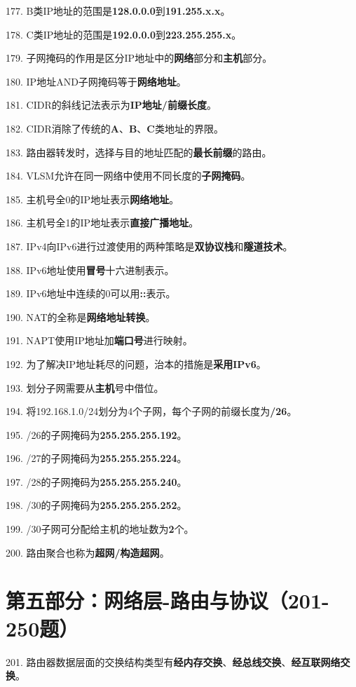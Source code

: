\documentclass[12pt,a4paper,openany]{ctexbook}
\begin{document}
177. B类IP地址的范围是\textbf{128.0.0.0}到\textbf{191.255.x.x}。

178. C类IP地址的范围是\textbf{192.0.0.0}到\textbf{223.255.255.x}。

179. 子网掩码的作用是区分IP地址中的\textbf{网络}部分和\textbf{主机}部分。

180. IP地址AND子网掩码等于\textbf{网络地址}。

181. CIDR的斜线记法表示为\textbf{IP地址/前缀长度}。

182. CIDR消除了传统的\textbf{A}、\textbf{B}、\textbf{C}类地址的界限。

183. 路由器转发时，选择与目的地址匹配的\textbf{最长前缀}的路由。

184. VLSM允许在同一网络中使用不同长度的\textbf{子网掩码}。

185. 主机号全0的IP地址表示\textbf{网络地址}。

186. 主机号全1的IP地址表示\textbf{直接广播地址}。

187. IPv4向IPv6进行过渡使用的两种策略是\textbf{双协议栈}和\textbf{隧道技术}。

188. IPv6地址使用\textbf{冒号}十六进制表示。

189. IPv6地址中连续的0可以用\textbf{::}表示。

190. NAT的全称是\textbf{网络地址转换}。

191. NAPT使用IP地址加\textbf{端口号}进行映射。

192. 为了解决IP地址耗尽的问题，治本的措施是\textbf{采用IPv6}。

193. 划分子网需要从\textbf{主机}号中借位。

194. 将192.168.1.0/24划分为4个子网，每个子网的前缀长度为\textbf{/26}。

195. /26的子网掩码为\textbf{255.255.255.192}。

196. /27的子网掩码为\textbf{255.255.255.224}。

197. /28的子网掩码为\textbf{255.255.255.240}。

198. /30的子网掩码为\textbf{255.255.255.252}。

199. /30子网可分配给主机的地址数为\textbf{2}个。

200. 路由聚合也称为\textbf{超网/构造超网}。

\section{第五部分：网络层-路由与协议（201-250题）}

201. 路由器数据层面的交换结构类型有\textbf{经内存交换}、\textbf{经总线交换}、\textbf{经互联网络交换}。
\end{document}
